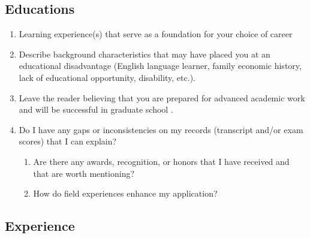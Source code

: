 \documentclass[a4paper,12pt]{article}%
\begin{document}
	  \hrulefill
	  
	  \hrulefill
	  
	  \hrulefill
	  
	  \hrulefill
	  
\subsection{Educations}
\label{sec:Educations}
\begin{enumerate}
 	\item	Learning experience(s) that serve as a foundation for your choice of career
\item 	Describe background characteristics that may have placed you at an educational disadvantage (English language learner, family economic history, lack of educational opportunity, disability, etc.).
	\item Leave the reader believing that you are prepared for advanced academic work and will be successful in graduate school .
	
\hrulefill

\hrulefill

	\item Do I have any gaps or inconsistencies on my records (transcript and/or exam scores) that I can explain?
 
 
 \begin{enumerate}
 
	\item Are there any awards, recognition, or honors that I have received and that are worth mentioning?
	\item How do field experiences enhance my application?
\end{enumerate}
 
	
 	\end{enumerate}
 		  \hrulefill
 		  
	  \hrulefill
	  
	  \hrulefill
	  
 	
\subsection{Experience}
\label{sec:Experience}
\end{document}
